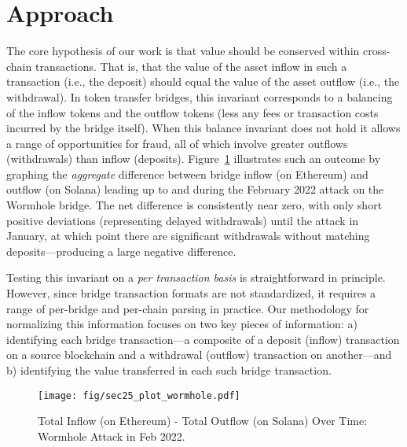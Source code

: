 \section{Approach}
\label{sec:meth}

The core hypothesis of our work is that value should be conserved
within cross-chain transactions.  That is, that the value of the asset
inflow in such a transaction (i.e., the deposit) should equal the
value of the asset outflow (i.e., the withdrawal).  In token transfer
bridges, this invariant corresponds to a balancing of the inflow
tokens and the outflow tokens (less any fees or transaction costs
incurred by the bridge itself).  When this balance invariant does not
hold it allows a range of opportunities for fraud, all of which
involve greater outflows (withdrawals) than inflow
(deposits). Figure~\ref{fig:invariant} illustrates such an outcome by 
graphing the \emph{aggregate} difference between bridge inflow (on
Ethereum) and outflow (on Solana) leading up to and during the
February 2022 attack on the Wormhole bridge.  The net difference is
consistently near zero, with only short positive deviations
(representing delayed withdrawals) until the attack in January, at
which point there are significant withdrawals without matching
deposits---producing a large negative difference.

Testing this invariant on a \emph{per transaction basis} is
straightforward in principle. However, since bridge transaction formats are
not standardized, it requires a range of per-bridge and per-chain
parsing in practice.  Our methodology for normalizing this information
focuses on two key pieces of information: a) identifying each bridge
transaction---a composite of a deposit (inflow) transaction on a
source blockchain and a withdrawal (outflow) transaction on
another---and b) identifying the value transferred in each such bridge
transaction.

\begin{figure}[t]
  \centering
  \texttt{[image: fig/sec25\_plot\_wormhole.pdf]}
  \caption[Wormhole Attack Invariant]{Total Inflow (on Ethereum) - Total Outflow (on Solana) Over Time: Wormhole Attack in Feb 2022.}
  \label{fig:invariant}

\end{figure}


